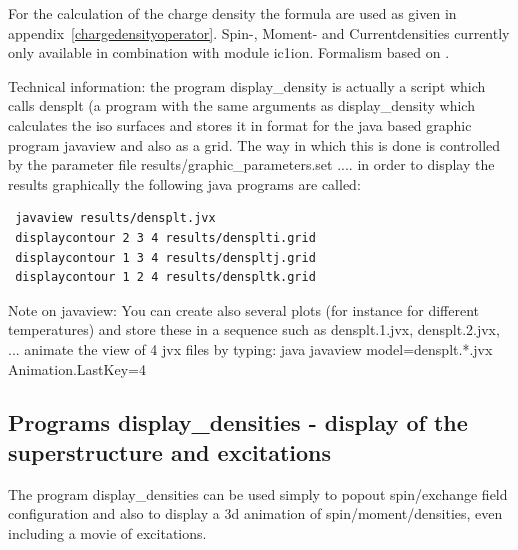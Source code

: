 For the calculation of the charge density the  formula are used as given in
appendix~\ref{chargedensityoperator}. 
Spin-, Moment- and Currentdensities
currently only available in combination with module {\prg ic1ion}.
Formalism based on \cite{balcar75-1581,balcar89-1,rotter11-12005}.


Technical information: the program {\prg display\_density} is actually a script which
calls  {\prg densplt} 
 (a program with the same arguments as {\prg display\_density}
which calculates the iso surfaces and stores
it in format for the java based graphic program {\prg javaview} and
also as a grid. The way in which this is done is controlled by 
the parameter file {\prg results/graphic\_parameters.set}
.... in  order to display the results graphically the following java
programs are called:
\begin{verbatim}
 javaview results/densplt.jvx
 displaycontour 2 3 4 results/densplti.grid
 displaycontour 1 3 4 results/denspltj.grid
 displaycontour 1 2 4 results/denspltk.grid
\end{verbatim}

Note on javaview: You can create also several plots (for instance for different temperatures) and store these
in a sequence such as densplt.1.jvx, densplt.2.jvx, ... animate
the view of 4 jvx files by typing: java javaview model=densplt.*.jvx Animation.LastKey=4 


\subsection{Programs {\prg display\_densities}  - display of the superstructure
and excitations}\label{displaydensities}


The program {\prg display\_densities} 
can be used simply to popout spin/exchange field configuration 
and also to display a 3d animation of spin/moment/densities, even including a movie of
excitations.

